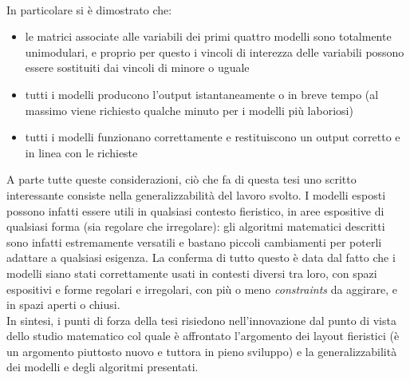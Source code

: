 \documentclass[12pt,a4paper,openright,twoside]{report}
\begin{document}
\\In particolare si \`{e} dimostrato che:
\begin{itemize}
\item le matrici associate alle variabili dei primi quattro modelli sono totalmente unimodulari, e proprio per questo i vincoli di interezza delle variabili possono essere sostituiti dai vincoli di minore o uguale 
\item tutti i modelli producono l'output istantaneamente o in breve tempo (al massimo viene richiesto qualche minuto per i modelli pi\`{u} laboriosi)
\item tutti i modelli funzionano correttamente e restituiscono un output corretto e in linea con le richieste
\end{itemize}
A parte tutte queste considerazioni, ci\`{o} che fa di questa tesi uno scritto interessante consiste nella generalizzabilit\`{a} del lavoro svolto. I modelli esposti possono infatti essere utili in qualsiasi contesto fieristico, in aree espositive di qualsiasi forma (sia regolare che irregolare): gli algoritmi matematici descritti sono infatti estremamente versatili e bastano piccoli cambiamenti per poterli adattare a qualsiasi esigenza. La conferma di tutto questo \`{e} data dal fatto che i modelli siano stati correttamente usati in contesti diversi tra loro, con spazi espositivi e forme regolari e irregolari, con pi\`{u} o meno \textit{constraints} da aggirare, e in spazi aperti o chiusi. \\
In sintesi, i punti di forza della tesi risiedono nell'innovazione dal punto di vista dello studio matematico col quale \`{e} affrontato l'argomento dei layout fieristici (\`{e} un argomento piuttosto nuovo e tuttora in pieno sviluppo) e la generalizzabilit\`{a} dei modelli e degli algoritmi presentati.
 
\end{document}

